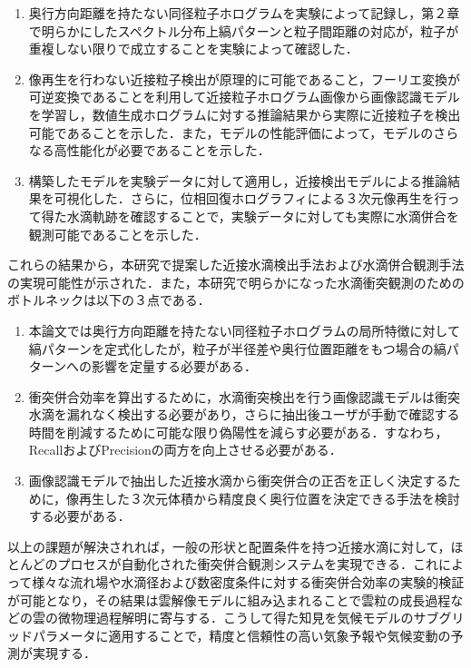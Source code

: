 \begin{enumerate}
    \item 奥行方向距離を持たない同径粒子ホログラムを実験によって記録し，第２章で明らかにしたスペクトル分布上縞パターンと粒子間距離の対応が，粒子が重複しない限りで成立することを実験によって確認した．
    \item 像再生を行わない近接粒子検出が原理的に可能であること，フーリエ変換が可逆変換であることを利用して近接粒子ホログラム画像から画像認識モデルを学習し，数値生成ホログラムに対する推論結果から実際に近接粒子を検出可能であることを示した．また，モデルの性能評価によって，モデルのさらなる高性能化が必要であることを示した．
    \item 構築したモデルを実験データに対して適用し，近接検出モデルによる推論結果を可視化した．さらに，位相回復ホログラフィによる３次元像再生を行って得た水滴軌跡を確認することで，実験データに対しても実際に水滴併合を観測可能であることを示した．
\end{enumerate}
これらの結果から，本研究で提案した近接水滴検出手法および水滴併合観測手法の実現可能性が示された．また，本研究で明らかになった水滴衝突観測のためのボトルネックは以下の３点である．
\begin{enumerate}
    \item 本論文では奥行方向距離を持たない同径粒子ホログラムの局所特徴に対して縞パターンを定式化したが，粒子が半径差や奥行位置距離をもつ場合の縞パターンへの影響を定量する必要がある．
    \item 衝突併合効率を算出するために，水滴衝突検出を行う画像認識モデルは衝突水滴を漏れなく検出する必要があり，さらに抽出後ユーザが手動で確認する時間を削減するために可能な限り偽陽性を減らす必要がある．すなわち，RecallおよびPrecisionの両方を向上させる必要がある．
    \item 画像認識モデルで抽出した近接水滴から衝突併合の正否を正しく決定するために，像再生した３次元体積から精度良く奥行位置を決定できる手法を検討する必要がある．
\end{enumerate}
以上の課題が解決されれば，一般の形状と配置条件を持つ近接水滴に対して，ほとんどのプロセスが自動化された衝突併合観測システムを実現できる．これによって様々な流れ場や水滴径および数密度条件に対する衝突併合効率の実験的検証が可能となり，その結果は雲解像モデルに組み込まれることで雲粒の成長過程などの雲の微物理過程解明に寄与する．こうして得た知見を気候モデルのサブグリッドパラメータに適用することで，精度と信頼性の高い気象予報や気候変動の予測が実現する．